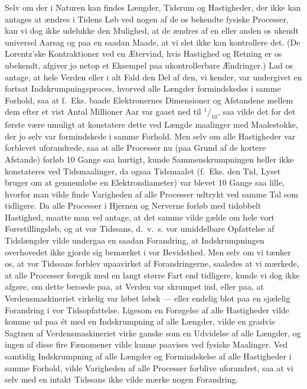 \documentclass[12pt,a4paper]{article}
\newcommand{\opage}[1]{\marginnote{\footnotesize\textit{[#1]}}}
\begin{document}
Selv om der i Naturen kan findes Længder, Tidsrum og Hastigheder, der ikke kan
antages at ændres i Tidens Løb ved nogen af de os bekendte fysiske Processer,
kan vi dog ikke udelukke den Mulighed, at de ændres af en eller anden os ukendt
universel Aarsag og paa en saadan Maade, at vi slet ikke kan kontrollere det.
(De Lorentz'ske Kontraktioner ved en Ætervind, hvis Hastighed og Retning er os
ubekendt, afgiver jo netop et Eksempel paa ukontrollerbare Ændringer.) Lad os
antage, at hele Verden eller i alt Fald den Del af den, vi kender, var
undergivet en fortsat Indskrumpningsproces, hvorved alle Længder formindskedes
i samme Forhold, saa at f.~Eks. baade Elektronernes Dimensioner og Afstandene
mellem dem efter et vist Antal Millioner Aar var gaaet ned til
$^{1}\!/_{10}$, saa vilde det for det første være umuligt at konstatere dette
ved Længde\-%
\opage{12}maalinger med Maalestokke, der jo selv var formindskede i samme Forhold. Men
selv om alle Hastigheder var forblevet uforandrede, saa at alle Processer nu
(paa Grund af de kortere Afstande) forløb 10 Gange saa hurtigt, kunde
Sammenskrumpningen heller ikke konstateres ved Tidsmaalinger, da ogsaa
Tidsmaalet (f.~Eks. den Tid, Lyset bruger om at gennemløbe en Elektrondiameter)
var blevet 10 Gange saa lille, hvorfor man vilde finde Varigheden af alle
Processer udtrykt ved samme Tal som tidligere. Da alle Processer i Hjernen og
Nerverne forløb med tidobbelt Hastighed, maatte man vel antage, at det samme
vilde gælde om hele vort Forestillingsløb, og at vor Tidssans, d.~v.~s. vor
umiddelbare Opfattelse af Tidslængder vilde undergaa en saadan Forandring, at
\guillemotleft Indskrumpningen\guillemotright{} overhovedet ikke gjorde sig
bemærket i vor Bevidsthed. Men selv om vi tænker os, at vor Tidssans forblev
upaavirket af Forandringerne, saaledes at vi mærkede, at alle Processer foregik
med en langt større Fart end tidligere, kunde vi dog ikke afgøre, om dette
beroede paa, at Verden var skrumpet ind, eller paa, at Verdensmaskineriet
virkelig var løbet løbsk --- eller endelig blot paa en sjælelig Forandring i
vor Tidsopfattelse. Ligesom en Forøgelse af alle Hastigheder vilde komme ud paa
ét med en Indskrumpning af alle Længder, vilde en gradvis Sagtnen af
Verdensmaskineriet virke ganske som en Udvidelse af alle Længder, og ingen af
disse fire Fænomener vilde kunne paavises ved fysiske Maalinger. Ved samtidig
Indskrumpning af alle Længder og Formindskelse af alle Hastigheder i samme
Forhold, vilde Varigheden af alle Processer forblive uforandret, saa at vi selv
med en intakt Tidssans ikke vilde mærke nogen Forandring.
\end{document}
